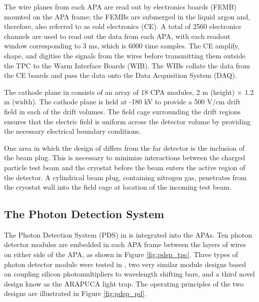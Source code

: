 The wire planes from each APA are read out by electronics boards (FEMB) 
mounted on the APA frame; the FEMBs are submerged in the liquid argon 
and, therefore, also referred to as cold electronics (CE). A total of 2560 
electronics channels are used to read out the data from each APA, with each
readout window corresponding to 3 ms, which is 6000 time samples. The CE 
amplify, shape, and digitise the signals from the wires before transmitting 
them outside the TPC to the Warm Interface Boards (WIB). The WIBs collate the 
data from the CE boards and pass the data onto the Data Acquisition System 
(DAQ).

The cathode plane in \protodune{} consists of an array of 18 CPA modules, 2 m 
(height) $\times$ 1.2 m (width). The cathode plane is held at -180 kV to 
provide a 500 $\mbox{V/cm}$ drift field in each of the drift volumes. The 
field cage surrounding the drift regions ensures that the electric field is 
uniform across the detector volume by providing the necessary electrical
boundary conditions.

One area in which the design of \protodune{} differs from the far detector is
the inclusion of the beam plug. This is necessary to minimize interactions
between the charged particle test beam and the cryostat before the beam enters 
the active region of the detector. A cylindrical beam plug, containing 
nitrogen gas, penetrates from the cryostat wall into the field cage at 
location of the incoming test beam. 

\subsection{The Photon Detection System}

The Photon Detection System (PDS) in \protodune{} is integrated into the APAs. 
Ten photon detector modules are embedded in each APA frame between the layers 
of wires on either side of the APA, as shown in Figure \ref{fig:pdsp_tpc}. 
Three types of photon detector module were tested in \protodune{}, two very 
similar module designs based on coupling silicon photomultipliers to 
wavelength shifting bars, and a third novel design know as the ARAPUCA light 
trap. The operating principles of the two designs are illustrated in Figure 
\ref{fig:pdsp_pd}.

